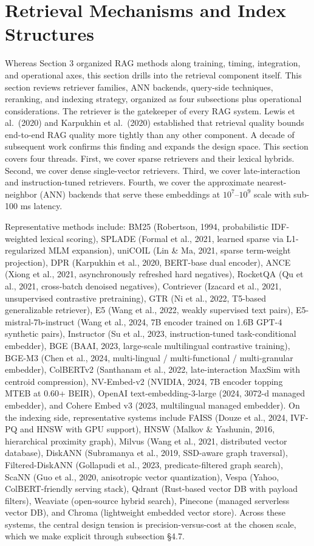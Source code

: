 \section{Retrieval Mechanisms and Index Structures}\label{retrieval-mechanisms-and-index-structures}

Whereas Section 3 organized RAG methods along training, timing, integration, and operational axes, this section drills into the retrieval component itself. This section reviews retriever families, ANN backends, query-side techniques, reranking, and indexing strategy, organized as four subsections plus operational considerations. The retriever is the gatekeeper of every RAG system. Lewis et al.~(2020) and Karpukhin et al.~(2020) established that retrieval quality bounds end-to-end RAG quality more tightly than any other component. A decade of subsequent work confirms this finding and expands the design space. This section covers four threads. First, we cover sparse retrievers and their lexical hybrids. Second, we cover dense single-vector retrievers. Third, we cover late-interaction and instruction-tuned retrievers. Fourth, we cover the approximate nearest-neighbor (ANN) backends that serve these embeddings at \(10^7\)--\(10^9\) scale with sub-100 ms latency.

Representative methods include: BM25 (Robertson, 1994, probabilistic IDF-weighted lexical scoring), SPLADE (Formal et al., 2021, learned sparse via L1-regularized MLM expansion), uniCOIL (Lin \& Ma, 2021, sparse term-weight projection), DPR (Karpukhin et al., 2020, BERT-base dual encoder), ANCE (Xiong et al., 2021, asynchronously refreshed hard negatives), RocketQA (Qu et al., 2021, cross-batch denoised negatives), Contriever (Izacard et al., 2021, unsupervised contrastive pretraining), GTR (Ni et al., 2022, T5-based generalizable retriever), E5 (Wang et al., 2022, weakly supervised text pairs), E5-mistral-7b-instruct (Wang et al., 2024, 7B encoder trained on 1.6B GPT-4 synthetic pairs), Instructor (Su et al., 2023, instruction-tuned task-conditional embedder), BGE (BAAI, 2023, large-scale multilingual contrastive training), BGE-M3 (Chen et al., 2024, multi-lingual / multi-functional / multi-granular embedder), ColBERTv2 (Santhanam et al., 2022, late-interaction MaxSim with centroid compression), NV-Embed-v2 (NVIDIA, 2024, 7B encoder topping MTEB at 0.60+ BEIR), OpenAI text-embedding-3-large (2024, 3072-d managed embedder), and Cohere Embed v3 (2023, multilingual managed embedder). On the indexing side, representative systems include FAISS (Douze et al., 2024, IVF-PQ and HNSW with GPU support), HNSW (Malkov \& Yashunin, 2016, hierarchical proximity graph), Milvus (Wang et al., 2021, distributed vector database), DiskANN (Subramanya et al., 2019, SSD-aware graph traversal), Filtered-DiskANN (Gollapudi et al., 2023, predicate-filtered graph search), ScaNN (Guo et al., 2020, anisotropic vector quantization), Vespa (Yahoo, ColBERT-friendly serving stack), Qdrant (Rust-based vector DB with payload filters), Weaviate (open-source hybrid search), Pinecone (managed serverless vector DB), and Chroma (lightweight embedded vector store). Across these systems, the central design tension is precision-versus-cost at the chosen scale, which we make explicit through subsection §4.7.

